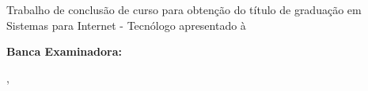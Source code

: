 % 
\begin{folhadeaprovacao}
	\begin{center}
	    \vspace*{2cm}
		{\ABNTEXchapterfont\bfseries\imprimirautor}
		\vspace{6em}

			\ABNTEXchapterfont\bfseries\imprimirtitulo
		
	\end{center}
	\hspace{.45\textwidth}
    \begin{minipage}{.5\textwidth}
    
    		\vspace{2em}
    		Trabalho de conclusão de curso para obtenção do título de graduação em Sistemas para Internet - Tecnólogo apresentado à \imprimirinstituicao
    	
	\end{minipage}
	
 	\vspace{3em}
	\noindent
	{\bfseries Banca Examinadora:}
	\assinatura{\textbf{\imprimirorientador} \\ \imprimirinstituicao} 

    \vspace*{\fill}
    \begin{center}
    	\imprimirlocal,\,\imprimirfulldata
    \end{center}
    \vspace*{1cm}
\end{folhadeaprovacao}





